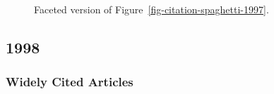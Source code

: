 \documentclass[
  10pt,
  letterpaper,
  DIV=11,
  numbers=noendperiod,
  twoside]{scrartcl}
\begin{document}
\begin{figure}


\caption{\label{fig-citation-facet-1997}Faceted version of
Figure~\ref{fig-citation-spaghetti-1997}.}

\end{figure}%

\newpage

\subsection{1998}\label{sec-s1998}

\subsubsection*{Widely Cited Articles}\label{widely-cited-articles-42}
\end{document}
